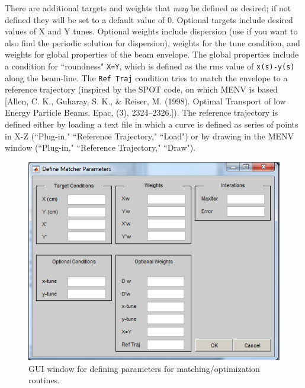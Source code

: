 \documentclass[../menv_main.tex]{subfiles}
\begin{document}
There are additional targets and weights that \textit{may} be defined as desired; if not defined they will be set to a default value of 0. Optional targets include desired values of X and Y tunes. Optional weights include dispersion (use if you want to also find the periodic solution for dispersion), weights for the tune condition, and weights for global properties of the beam envelope. The global properties include a condition for ``roundness" \verb|X=Y|, which is defined as the rms value of \verb|x(s)-y(s)| along the beam-line. The \verb|Ref Traj| condition tries to match the envelope to a reference trajectory (inspired by the SPOT code, on which MENV is based [Allen, C. K., Guharay, S. K., \& Reiser, M. (1998). Optimal Transport of low Energy Particle Beams. Epac, (3), 2324–2326.]). The reference trajectory is defined either by loading a text file in which a curve is defined as series of points in X-Z (``Plug-in," ``Reference Trajectory," ``Load") or by drawing in the MENV window (``Plug-in," ``Reference Trajectory," ``Draw"). 

\begin{figure}
\centering
\includegraphics{figures/defmatcher_window.png}
\caption{GUI window for defining parameters for matching/optimization routines.}
\label{fig:defmatcher}
\end{figure}
\end{document}
